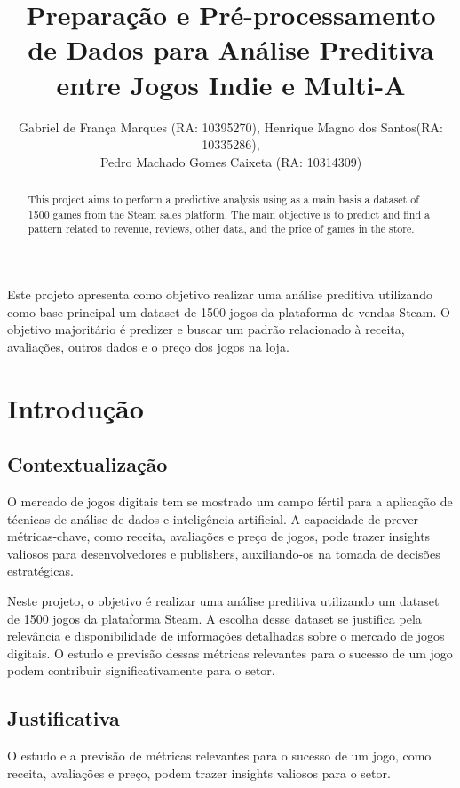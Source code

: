 \documentclass[12pt]{article}
\title{Preparação e Pré-processamento de Dados para Análise Preditiva entre Jogos Indie e Multi-A}
\author{Gabriel de França Marques (RA: 10395270)\inst{1}, Henrique Magno dos Santos(RA: 10335286)\inst{1}, \\ 
Pedro Machado Gomes Caixeta (RA: 10314309)\inst{1}}
\begin{document}
 

\maketitle

\begin{abstract}
This project aims to perform a predictive analysis using as a main basis a dataset of
1500 games from the Steam sales platform. The main objective is to predict and find a
pattern related to revenue, reviews, other data, and the price of games in the store.
\end{abstract}

\begin{resumo}
Este projeto apresenta como objetivo realizar uma análise preditiva utilizando
como base principal um dataset de 1500 jogos da plataforma de vendas Steam. O
objetivo majoritário é predizer e buscar um padrão relacionado à receita, avaliações,
outros dados e o preço dos jogos na loja.
\end{resumo}


\section{Introdução}
\subsection{Contextualização} \label{sec:contextualizacao}

O mercado de jogos digitais tem se mostrado um campo fértil para a aplicação de técnicas 
de análise de dados e inteligência artificial. A capacidade de prever métricas-chave, 
como receita, avaliações e preço de jogos, pode trazer insights valiosos para 
desenvolvedores e publishers, auxiliando-os na tomada de decisões estratégicas.

Neste projeto, o objetivo é realizar uma análise preditiva utilizando um dataset de 1500 
jogos da plataforma Steam. A escolha desse dataset se justifica pela relevância e 
disponibilidade de informações detalhadas sobre o mercado de jogos digitais. O estudo e 
 previsão dessas métricas relevantes para o sucesso de um jogo podem contribuir 
 significativamente para o setor.

\subsection{Justificativa} \label{sec:firstpage}

O estudo e a previsão de métricas relevantes para o sucesso de um jogo, como receita, 
avaliações e preço, podem trazer insights valiosos para o setor.
\end{document}
